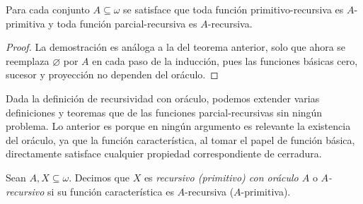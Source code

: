 \begin{agregado}[teorema]
\begin{theorem}
	\label{theo: prim_en_prim_a} %
	Para cada conjunto $A\subseteq\omega$ se satisface que toda función primitivo-recursiva es $A$-primitiva y toda función parcial-recursiva es $A$-recursiva.
\end{theorem}

\begin{proof}
	La demostración es análoga a la del teorema anterior, solo que ahora se reemplaza $\varnothing$ por $A$ en cada paso de la inducción, pues las funciones básicas cero, sucesor y proyección no dependen del oráculo.
\end{proof}
\end{agregado}

Dada la definición de recursividad con oráculo, podemos extender varias definiciones y teoremas que de las funciones parcial-recursivas sin ningún problema. Lo anterior es porque en ningún argumento es relevante la existencia del oráculo, ya que la función característica, al tomar el papel de función básica, directamente satisface cualquier propiedad correspondiente de cerradura.

\begin{definition}
	Sean $A, X\subseteq\omega$. Decimos que $X$ es \emph{recursivo (primitivo) con oráculo $A$} o \emph{$A$-recursivo} si su función característica es $A$-recursiva ($A$-primitiva).
\end{definition}


